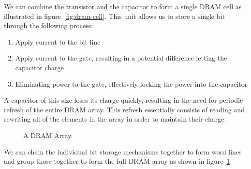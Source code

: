 We can combine the transistor and the capacitor to form a single DRAM cell as illustrated in figure~\ref{fig:dram-cell}. This unit allows us to store a single bit through the following process:
\begin{enumerate}
  \item Apply current to the bit line
  \item Apply current to the gate, resulting in a potential difference letting the capacitor charge
  \item Eliminating power to the gate, effectively locking the power into the capacitor
\end{enumerate}
A capacitor of this size loses its charge quickly, resulting in the need for periodic refresh of the entire DRAM array. This refresh essentially consists of reading and rewriting all of the elements in the array in order to maintain their charge.

\begin{figure}
  \centering
  \caption{A DRAM Array.}
  \label{fig:dram-array}
\end{figure}
We can chain the individual bit storage mechanisms together to form word lines and group those together to form the full DRAM array as shown in figure~\ref{fig:dram-array}. 
